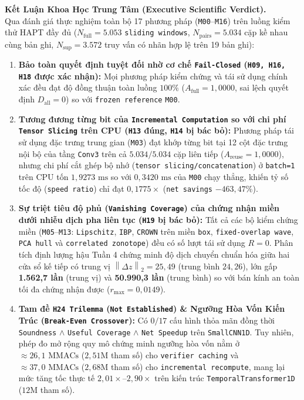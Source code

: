 \documentclass[11pt,a4paper]{article}
\newcommand{\norm}[1]{\left\lVert #1\right\rVert}
\newcommand{\code}[1]{{\small\ttfamily\nolinkurl{#1}}}
\theoremstyle{remark}
\begin{document}
\begin{titlepage}
\vspace{0.5cm}
\noindent\colorbox{pale}{%
\parbox{\dimexpr\linewidth-2\fboxsep}{%
\textbf{\color{ink}Kết Luận Khoa Học Trung Tâm (Executive Scientific Verdict).}\\[3pt]
Qua đánh giá thực nghiệm toàn bộ 17 phương pháp (\code{M00}--\code{M16}) trên luồng kiểm thử HAPT đầy đủ ($N_{\text{full}} = 5.053$ \code{sliding windows}, $N_{\text{pairs}} = 5.034$ cặp kề nhau cùng bản ghi, $N_{\text{sup}} = 3.572$ truy vấn có nhãn hợp lệ trên 19 bản ghi):
\begin{enumerate}[leftmargin=1.4em]
  \item \textbf{Bảo toàn quyết định tuyệt đối nhờ cơ chế \code{Fail-Closed} (\code{H09, H16, H18} được xác nhận):} Mọi phương pháp kiểm chứng và tái sử dụng chính xác đều đạt độ đồng thuận toàn luồng $100\%$ ($A_{\text{full}} = 1,0000$, sai lệch quyết định $D_{\text{all}} = 0$) so với \code{frozen reference} \code{M00}.
  \item \textbf{Tương đương từng bit của \code{Incremental Computation} so với chi phí \code{Tensor Slicing} trên CPU (\code{H13} đúng, \code{H14} bị bác bỏ):} Phương pháp tái sử dụng đặc trưng trung gian (\code{M03}) đạt khớp từng bit tại 12 cột đặc trưng nội bộ của tầng \code{Conv3} trên cả $5.034/5.034$ cặp liên tiếp ($A_{\text{reuse}} = 1,0000$), nhưng chi phí cắt ghép bộ nhớ (\code{tensor slicing/concatenation}) ở \code{batch=1} trên CPU tốn $1,9273\text{ ms}$ so với $0,3420\text{ ms}$ của \code{M00} chạy thẳng, khiến tỷ số tốc độ (\code{speed ratio}) chỉ đạt $0,1775\times$ (\code{net savings} $-463,47\%$).
  \item \textbf{Sự triệt tiêu độ phủ (\code{Vanishing Coverage}) của chứng nhận miền dưới nhiễu dịch pha liên tục (\code{H19} bị bác bỏ):} Tất cả các bộ kiểm chứng miền (\code{M05}--\code{M13}: \code{Lipschitz}, \code{IBP}, \code{CROWN} trên miền \code{box}, \code{fixed-overlap wave}, \code{PCA hull} và \code{correlated zonotope}) đều có số lượt tái sử dụng $R = 0$. Phân tích định lượng hậu Tuần 4 chứng minh độ dịch chuyển chuẩn hóa giữa hai cửa sổ kế tiếp có trung vị $\norm{\Delta z}_2 = 25,49$ (trung bình $24,26$), lớn gấp \textbf{1.562,7 lần} (trung vị) và \textbf{50.990,3 lần} (trung bình) so với bán kính an toàn tối đa chứng nhận được ($r_{\max} = 0,0149$).
  \item \textbf{Tam đề \code{H24 Trilemma} (\code{Not Established}) \& Ngưỡng Hòa Vốn Kiến Trúc (\code{Break-Even Crossover}):} Có $0/17$ cấu hình thỏa mãn đồng thời \code{Soundness} $\land$ \code{Useful Coverage} $\land$ \code{Net Speedup} trên \code{SmallCNN1D}. Tuy nhiên, phép đo mở rộng quy mô chứng minh ngưỡng hòa vốn nằm ở $\approx 26,1\text{ MMACs}$ ($2,51\text{M}$ tham số) cho \code{verifier caching} và $\approx 37,0\text{ MMACs}$ ($2,68\text{M}$ tham số) cho \code{incremental recompute}, mang lại mức tăng tốc thực tế $2,01\times$--$2,90\times$ trên kiến trúc \code{TemporalTransformer1D} ($12\text{M}$ tham số).
\end{enumerate}
}}
\vfill
\end{titlepage}
\hypersetup{pageanchor=true}
\end{document}
